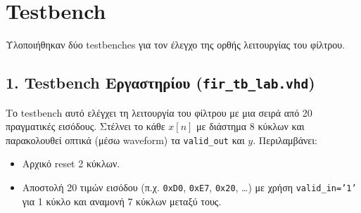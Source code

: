 \documentclass[12pt]{article}
\begin{document}
\section*{Testbench}

Υλοποιήθηκαν δύο testbenches για τον έλεγχο της ορθής λειτουργίας του φίλτρου.

\subsection*{1. Testbench Εργαστηρίου (\texttt{fir\_tb\_lab.vhd})}

Το testbench αυτό ελέγχει τη λειτουργία του φίλτρου με μια σειρά από 20 πραγματικές εισόδους. Στέλνει το κάθε $x[n]$ με διάστημα 8 κύκλων και παρακολουθεί οπτικά (μέσω waveform) τα \texttt{valid\_out} και $y$. Περιλαμβάνει:

\begin{itemize}
    \item Αρχικό reset 2 κύκλων.
    \item Αποστολή 20 τιμών εισόδου (π.χ. \texttt{0xD0}, \texttt{0xE7}, \texttt{0x20}, \ldots) με χρήση \texttt{valid\_in='1'} για 1 κύκλο και αναμονή 7 κύκλων μεταξύ τους.
\end{itemize}
\end{document}
